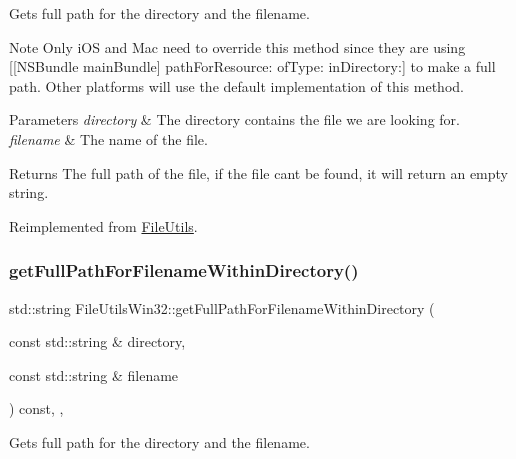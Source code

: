 Gets full path for the directory and the filename.

\begin{DoxyNote}{Note}
Only i\+OS and Mac need to override this method since they are using {\ttfamily \mbox{[}\mbox{[}N\+S\+Bundle main\+Bundle\mbox{]} path\+For\+Resource\+: of\+Type\+: in\+Directory\+:\mbox{]}} to make a full path. Other platforms will use the default implementation of this method. 
\end{DoxyNote}

\begin{DoxyParams}{Parameters}
{\em directory} & The directory contains the file we are looking for. \\
\hline
{\em filename} & The name of the file. \\
\hline
\end{DoxyParams}
\begin{DoxyReturn}{Returns}
The full path of the file, if the file can\textquotesingle{}t be found, it will return an empty string. 
\end{DoxyReturn}


Reimplemented from \hyperlink{classFileUtils_a543d684dc27fc7d02fbe387271d92c12}{File\+Utils}.

\mbox{\label{classFileUtilsWin32_a724a4ac17310d89813bf96180321dfb2}} 
\subsubsection{\texorpdfstring{get\+Full\+Path\+For\+Filename\+Within\+Directory()}{getFullPathForFilenameWithinDirectory()}}
{\footnotesize\ttfamily std\+::string File\+Utils\+Win32\+::get\+Full\+Path\+For\+Filename\+Within\+Directory (\begin{DoxyParamCaption}\item[{const std\+::string \&}]{directory,  }\item[{const std\+::string \&}]{filename }\end{DoxyParamCaption}) const\hspace{0.3cm}{\ttfamily [override]}, {\ttfamily [protected]}, {\ttfamily [virtual]}}

Gets full path for the directory and the filename.

